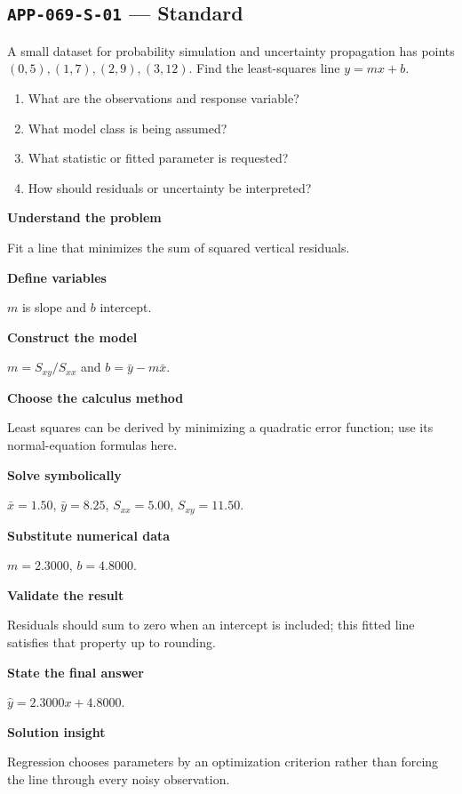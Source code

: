 \documentclass[11pt]{book}
\newcommand{\pid}[1]{\texttt{#1}}
\begin{document}
\subsection*{\pid{APP-069-S-01} — Standard}
\begin{problembox}
A small dataset for probability simulation and uncertainty propagation has points $(0,5),(1,7),(2,9),(3,12)$. Find the least-squares line $y=mx+b$.
\end{problembox}
\begin{promptbox}\begin{enumerate}
\item What are the observations and response variable?
\item What model class is being assumed?
\item What statistic or fitted parameter is requested?
\item How should residuals or uncertainty be interpreted?
\end{enumerate}\end{promptbox}
\begin{solutionbox}
\textbf{Understand the problem}\par Fit a line that minimizes the sum of squared vertical residuals.\par\medskip
\textbf{Define variables}\par $m$ is slope and $b$ intercept.\par\medskip
\textbf{Construct the model}\par $m=S_{xy}/S_{xx}$ and $b=\bar y-m\bar x$.\par\medskip
\textbf{Choose the calculus method}\par Least squares can be derived by minimizing a quadratic error function; use its normal-equation formulas here.\par\medskip
\textbf{Solve symbolically}\par $\bar x=1.50$, $\bar y=8.25$, $S_{xx}=5.00$, $S_{xy}=11.50$.\par\medskip
\textbf{Substitute numerical data}\par $m=2.3000$, $b=4.8000$.\par\medskip
\textbf{Validate the result}\par Residuals should sum to zero when an intercept is included; this fitted line satisfies that property up to rounding.\par\medskip
\textbf{State the final answer}\par $\hat y=2.3000x+4.8000$.\par\medskip
\textbf{Solution insight}\par Regression chooses parameters by an optimization criterion rather than forcing the line through every noisy observation.\par\medskip
\end{solutionbox}
\end{document}
